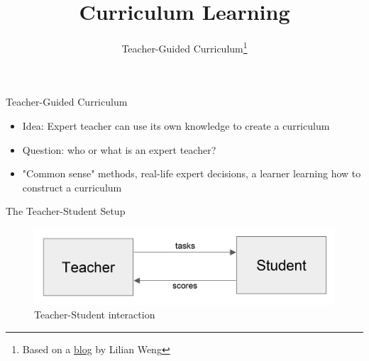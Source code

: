 


\title[Curriculum RL]{Curriculum Learning}
\subtitle{Teacher-Guided Curriculum\footnote{Based on a \href{https://lilianweng.github.io/lil-log/2020/01/29/curriculum-for-reinforcement-learning.html}{blog} by Lilian Weng}}



	
	\maketitle

\begin{frame}[c]{Teacher-Guided Curriculum}
	
	\begin{itemize}
		\item Idea: Expert teacher can use its own knowledge to create a curriculum
		\item Question: who or what is an expert teacher?
		\pause
		\item "Common sense" methods, real-life expert decisions, a learner learning how to construct a curriculum
	\end{itemize}
	
\end{frame}

\begin{frame}[c]{The Teacher-Student Setup }
	
	\begin{figure}
	\centering
	\includegraphics[scale= 0.5]{images/teacher_student.png}
	\caption{Teacher-Student interaction}
	\end{figure}
	
\end{frame}

